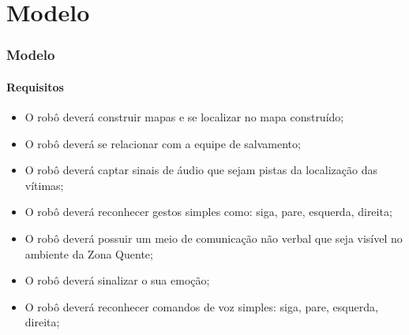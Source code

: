 \documentclass[aspectratio=169]{beamer}
\begin{document}
\section{Modelo}

\begin{frame}
\frametitle{Modelo}
\framesubtitle{Requisitos}
\begin{itemize}
\item O robô deverá construir mapas e se localizar no mapa construído;
\item O robô deverá se relacionar com a equipe de salvamento;
\item O robô deverá captar sinais de áudio que sejam pistas da localização das vítimas;
\item O robô deverá reconhecer gestos simples como: siga, pare, esquerda, direita;
\item O robô deverá possuir um meio de comunicação não verbal que seja visível no ambiente da Zona Quente;
\item O robô deverá sinalizar o sua emoção;
\item O robô deverá reconhecer comandos de voz simples: siga, pare, esquerda, direita;
\end{itemize}
\end{frame}
\end{document}
